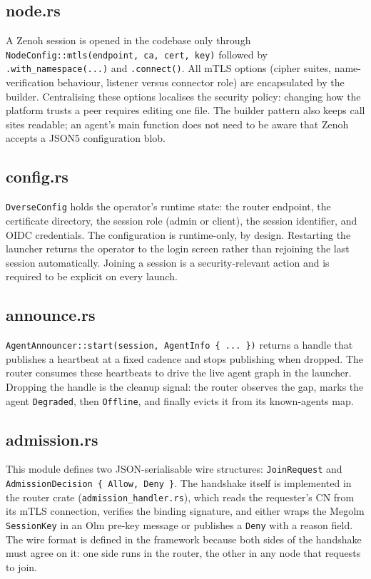 \documentclass[11pt,a4paper]{article}
\begin{document}
\subsection{node.rs}

A Zenoh session is opened in the codebase only through
\texttt{NodeConfig::mtls(endpoint, ca, cert, key)} followed by
\texttt{.with\_namespace(...)} and \texttt{.connect()}. All mTLS
options (cipher suites, name-verification behaviour, listener
versus connector role) are encapsulated by the builder.
Centralising these options localises the security policy:
changing how the platform trusts a peer requires editing one file.
The builder pattern also keeps call sites readable; an agent's
main function does not need to be aware that Zenoh accepts a JSON5
configuration blob.

\subsection{config.rs}

\texttt{DverseConfig} holds the operator's runtime state: the
router endpoint, the certificate directory, the session role
(admin or client), the session identifier, and OIDC credentials.
The configuration is runtime-only, by design. Restarting the
launcher returns the operator to the login screen rather than
rejoining the last session automatically. Joining a session is a
security-relevant action and is required to be explicit on every
launch.

\subsection{announce.rs}

\texttt{AgentAnnouncer::start(session, AgentInfo \{ ... \})}
returns a handle that publishes a heartbeat at a fixed cadence
and stops publishing when dropped. The router consumes these
heartbeats to drive the live agent graph in the launcher.
Dropping the handle is the cleanup signal: the router observes
the gap, marks the agent \texttt{Degraded}, then \texttt{Offline},
and finally evicts it from its known-agents map.

\subsection{admission.rs}

This module defines two JSON-serialisable wire structures:
\texttt{JoinRequest} and \texttt{AdmissionDecision \{ Allow, Deny
\}}. The handshake itself is implemented in the router crate
(\texttt{admission\_handler.rs}), which reads the requester's CN
from its mTLS connection, verifies the binding signature, and
either wraps the Megolm \texttt{SessionKey} in an Olm pre-key
message or publishes a \texttt{Deny} with a reason field. The
wire format is defined in the framework because both sides of the
handshake must agree on it: one side runs in the router, the
other in any node that requests to join.
\end{document}
